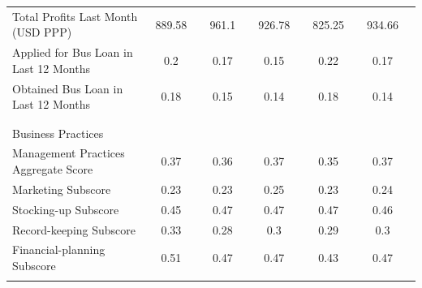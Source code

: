 \documentclass[hideothersubsections, usenames,dvipsnames,11pt]{beamer}
\newenvironment{itemize_2pt}{\itemize\addtolength{\itemsep}{2pt}}{\enditemize}
\begin{document}
\begin{frame}
{{\begin{table}
\begin{tabular}{l*{10}{c}}
Total Profits Last Month (USD PPP)						& 889.58	&& 961.1 &&	926.78	&& 825.25	&& 934.66 \\
Applied for Bus Loan in Last 12 Months
			    & 0.2	&& 0.17	&& 0.15	&& 0.22	&& 0.17 \\
													
Obtained Bus Loan in Last 12 Months
						& 0.18 &&	0.15	&& 0.14	&& 0.18	&& 0.14 \\[0.5ex]
\\
\\
\textcolor{bdf}{Business Practices} \\
Management Practices Aggregate Score											& 0.37	&& 0.36	&& 0.37	&& 0.35	&& 0.37 \\
\hspace{3mm}Marketing Subscore												& 0.23	&& 0.23 &&	0.25	&& 0.23	&& 0.24 \\
\hspace{3mm}Stocking-up	Subscore											& 0.45	&& 0.47	&& 0.47	&& 0.47	&& 0.46 \\
\hspace{3mm}Record-keeping Subscore											& 0.33	&& 0.28	&& 0.3	&& 0.29 &&	0.3 \\
\hspace{3mm}Financial-planning Subscore									& 0.51	&& 0.47	&& 0.47	&& 0.43	&& 0.47 \\
&		&&		&&		&& \\
		\hline
		\hline
			\end{tabular}
		
		
	\end{table}}}
\end{frame}
\end{document}
